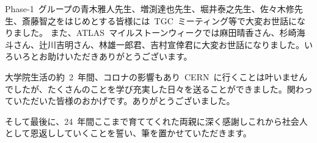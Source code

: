 Phase-1~グループの青木雅人先生、増渕達也先生、堀井泰之先生、佐々木修先生、斎藤智之をはじめとする皆様には~TGC~ミーティング等で大変お世話になりました。
また、ATLAS~マイルストーンウィークでは麻田晴香さん、杉崎海斗さん、辻川吉明さん、林雄一郎君、吉村宣倖君に大変お世話になりました。いろいろとお助けいただきありがとうございます。

大学院生活の約~2~年間、コロナの影響もあり~CERN~に行くことは叶いませんでしたが、たくさんのことを学び充実した日々を送ることができました。関わっていただいた皆様のおかげです。ありがとうございました。

そして最後に、24~年間ここまで育ててくれた両親に深く感謝しこれから社会人として恩返ししていくことを誓い、筆を置かせていただきます。